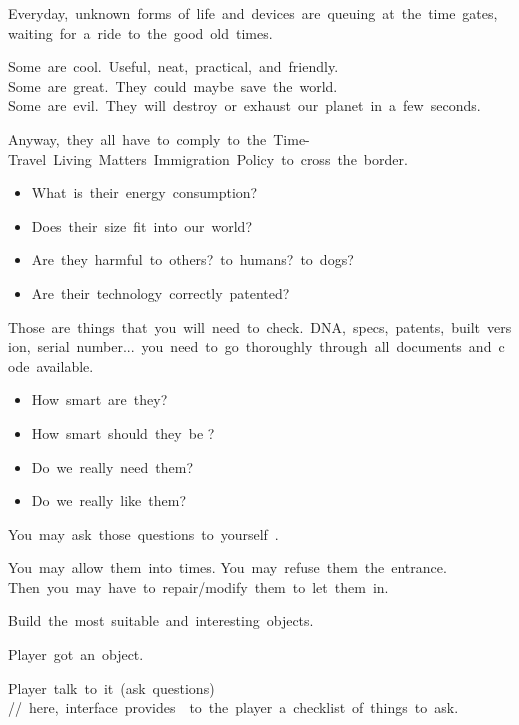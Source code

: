 \newline
{}

Everyday,~unknown~forms~of~life~and~devices~are~queuing~at~the~time~gates,~waiting~for~a~ride~to~the~good~old~times.

Some~are~cool.~Useful,~neat,~practical,~and~friendly.\newline
Some~are~great.~They~could~maybe~save~the~world.\newline
Some~are~evil.~They~will~destroy~or~exhaust~our~planet~in~a~few~seconds.

Anyway,~they~all~have~to~comply~to~the~Time-Travel~Living~Matters~Immigration~Policy~to~cross~the~border.

\liststyleLvii
\begin{itemize}
\item What~is~their~energy~consumption? 
\item Does~their~size~fit~into~our~world? 
\item Are~they~harmful~to~others?~to~humans?~to~dogs? 
\item Are~their~technology~correctly~patented? 
\end{itemize}
Those~are~things~that~you~will~need~to~check.~DNA,~specs,~patents,~built~version,~serial~number...~you~need~to~go~thoroughly~through~all~documents~and~code~available.

\liststyleLviii
\begin{itemize}
\item How~smart~are~they?~ 
\item How~smart~should~they~be ? 
\item Do~we~really~need~them? 
\item Do~we~really~like~them? 
\end{itemize}
You~may~ask~those~questions~to~yourself~.

You~may~allow~them~into~times.\newline
You~may~refuse~them~the~entrance.\newline
Then~you~may~have~to~repair/modify~them~to~let~them~in.


Build~the~most~suitable~and~interesting~objects.


Player~got~an~object.

Player~talk~to~it~(ask~questions)\newline
//~here,~interface~provides~~to~the~player~a~checklist~of~things~to~ask.

